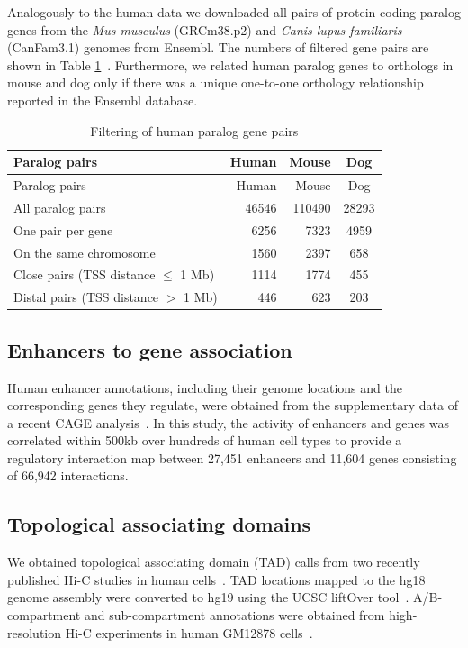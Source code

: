 \documentclass[a4paper,twoside=true,openright,parskip=full,chapterprefix=true,11pt,headings=normal,bibliography=totoc,listof=totoc,titlepage=on,captions=tableabove,draft=false]{scrreprt}
\theoremstyle{definition}
\theoremstyle{definition}
\theoremstyle{definition}
\theoremstyle{remark}
\begin{document}
Analogously to the human data we downloaded all pairs of protein coding
paralog genes from the \emph{Mus musculus} (GRCm38.p2) and \emph{Canis
lupus familiaris} (CanFam3.1) genomes from Ensembl. The numbers of
filtered gene pairs are shown in Table \ref{tab:filter}~. Furthermore,
we related human paralog genes to orthologs in mouse and dog only if
there was a unique one-to-one orthology relationship reported in the
Ensembl database.

\begin{longtable}[]{@{}lrrc@{}}
\caption{\label{tab:filter} Filtering of human paralog gene
pairs}\tabularnewline
\toprule
Paralog pairs & Human & Mouse & Dog\tabularnewline
\midrule
\endfirsthead
\toprule
Paralog pairs & Human & Mouse & Dog\tabularnewline
\midrule
\endhead
All paralog pairs & 46546 & 110490 & 28293\tabularnewline
One pair per gene & 6256 & 7323 & 4959\tabularnewline
On the same chromosome & 1560 & 2397 & 658\tabularnewline
Close pairs (TSS distance \(\leq\) 1 Mb) & 1114 & 1774 &
455\tabularnewline
Distal pairs (TSS distance \(>\) 1 Mb) & 446 & 623 & 203\tabularnewline
\bottomrule
\end{longtable}

\hypertarget{enhancers-to-gene-association}{%
\subsection{Enhancers to gene
association}\label{enhancers-to-gene-association}}

Human enhancer annotations, including their genome locations and the
corresponding genes they regulate, were obtained from the supplementary
data of a recent CAGE analysis~\citep{Andersson2014}. In this study, the
activity of enhancers and genes was correlated within 500kb over
hundreds of human cell types to provide a regulatory interaction map
between 27,451 enhancers and 11,604 genes consisting of 66,942
interactions.

\hypertarget{topological-associating-domains}{%
\subsection{Topological associating
domains}\label{topological-associating-domains}}

We obtained topological associating domain (TAD) calls from two recently
published Hi-C studies in human cells~\citep{Dixon2012, Rao2014}. TAD
locations mapped to the hg18 genome assembly were converted to hg19
using the UCSC liftOver tool~\citep{Hinrichs2006}. A/B-compartment and
sub-compartment annotations were obtained from high-resolution Hi-C
experiments in human GM12878 cells~\citep{Rao2014}.
\end{document}
